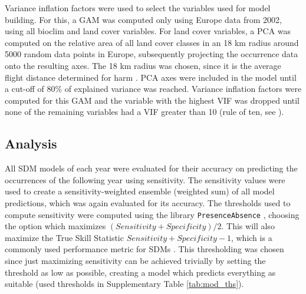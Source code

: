 \documentclass[12pt,a4paper]{article}
\begin{document}
Variance inflation factors were used to select the variables used for model building.
For this, a GAM was computed only using Europe data from 2002, using all bioclim and land cover variables.
For land cover variables, a PCA was computed on the relative area of all land cover classes in an 18 km radius around 5000 random data points in Europe, subsequently projecting the occurrence data onto the resulting axes.
The 18 km radius was chosen, since it is the average flight distance determined for \gls{harm} \autocite{jeffries2013flightharmonia}.
PCA axes were included in the model until a cut-off of 80\% of explained variance was reached.
Variance inflation factors were computed for this GAM and the variable with the highest VIF was dropped until none of the remaining variables had a VIF greater than 10 (rule of ten, see \cite{obrien2007cautionVIFs}).

\subsection{Analysis} \label{ssec:analysis}
All SDM models of each year were evaluated for their accuracy on predicting the occurrences of the following year using sensitivity.
The sensitivity values were used to create a sensitivity-weighted ensemble (weighted sum) of all model predictions, which was again evaluated for its accuracy.
The thresholds used to compute sensitivity were computed using the library \texttt{PresenceAbsence} \autocite{freeman2008presenceabsence}, choosing the option which maximizes $(Sensitivity + Specificity) / 2$.
This will also maximize the True Skill Statistic $Sensitivity + Specificity - 1$, which is a commonly used performance metric for SDMs \autocite{leroy2018TSSissues}.
This thresholding was chosen since just maximizing sensitivity can be achieved trivially by setting the threshold as low as possible, creating a model which predicts everything as suitable (used thresholds in Supplementary Table \ref{tab:mod_ths}).
\end{document}
